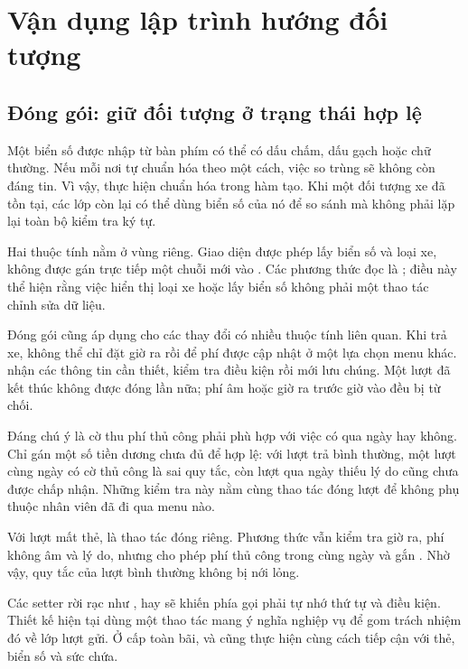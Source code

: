 \chapter{Vận dụng lập trình hướng đối tượng}
\label{chap:oop}

\section{Đóng gói: giữ đối tượng ở trạng thái hợp lệ}
Một biển số được nhập từ bàn phím có thể có dấu chấm, dấu gạch hoặc chữ thường. Nếu mỗi nơi tự chuẩn hóa theo một cách, việc so trùng sẽ không còn đáng tin. Vì vậy,  thực hiện chuẩn hóa trong hàm tạo. Khi một đối tượng xe đã tồn tại, các lớp còn lại có thể dùng biển số của nó để so sánh mà không phải lặp lại toàn bộ kiểm tra ký tự.


Hai thuộc tính nằm ở vùng riêng. Giao diện được phép lấy biển số và loại xe, không được gán trực tiếp một chuỗi mới vào . Các phương thức đọc là ; điều này thể hiện rằng việc hiển thị loại xe hoặc lấy biển số không phải một thao tác chỉnh sửa dữ liệu.

Đóng gói cũng áp dụng cho các thay đổi có nhiều thuộc tính liên quan. Khi trả xe, không thể chỉ đặt giờ ra rồi để phí được cập nhật ở một lựa chọn menu khác.  nhận các thông tin cần thiết, kiểm tra điều kiện rồi mới lưu chúng. Một lượt đã kết thúc không được đóng lần nữa; phí âm hoặc giờ ra trước giờ vào đều bị từ chối.


Đáng chú ý là cờ thu phí thủ công phải phù hợp với việc có qua ngày hay không. Chỉ gán một số tiền dương chưa đủ để hợp lệ: với lượt trả bình thường, một lượt cùng ngày có cờ thủ công là sai quy tắc, còn lượt qua ngày thiếu lý do cũng chưa được chấp nhận. Những kiểm tra này nằm cùng thao tác đóng lượt để không phụ thuộc nhân viên đã đi qua menu nào.

Với lượt mất thẻ,  là thao tác đóng riêng. Phương thức vẫn kiểm tra giờ ra, phí không âm và lý do, nhưng cho phép phí thủ công trong cùng ngày và gắn . Nhờ vậy, quy tắc của lượt bình thường không bị nới lỏng.

Các setter rời rạc như ,  hay  sẽ khiến phía gọi phải tự nhớ thứ tự và điều kiện. Thiết kế hiện tại dùng một thao tác mang ý nghĩa nghiệp vụ để gom trách nhiệm đó về lớp lượt gửi. Ở cấp toàn bãi,  và  cũng thực hiện cùng cách tiếp cận với thẻ, biển số và sức chứa.


